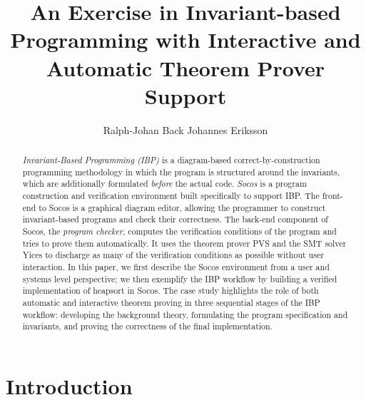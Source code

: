 \documentclass[english,submission]{eptcs}
\begin{document}
\title{An Exercise in Invariant-based Programming with Interactive and Automatic Theorem Prover Support}

\author{Ralph-Johan Back \qquad\qquad Johannes Eriksson
 }

\def\titlerunning{An Exercise in IBP with Interactive and Automatic
Theorem Prover Support}
\def\authorrunning{R.-J. Back \& J. Eriksson}

\def\event{THedu'11}

\maketitle

\begin{abstract}
  \emph{Invariant-Based Programming (IBP)} is a diagram-based
  correct-by-construction programming methodology in which the program
  is structured around the invariants, which are additionally
  formulated \emph{before }the actual code. \emph{Socos} is a program
  construction and verification environment built specifically to
  support IBP. The front-end to Socos is a graphical diagram editor,
  allowing the programmer to construct invariant-based programs and
  check their correctness. The back-end component of Socos, the
  \emph{program checker}, computes the verification conditions of the
  program and tries to prove them automatically. It uses the theorem
  prover PVS and the SMT solver Yices to discharge as many of the
  verification conditions as possible without user interaction. In
  this paper, we first describe the Socos environment from a user and
  systems level perspective; we then exemplify the IBP workflow by
  building a verified implementation of heapsort in Socos. The case
  study highlights the role of both automatic and interactive theorem
  proving in three sequential stages of the IBP workflow: developing
  the background theory, formulating the program specification and
  invariants, and proving the correctness of the final implementation.
\end{abstract}

\section{Introduction\label{sec:Introduction}}
\end{document}
